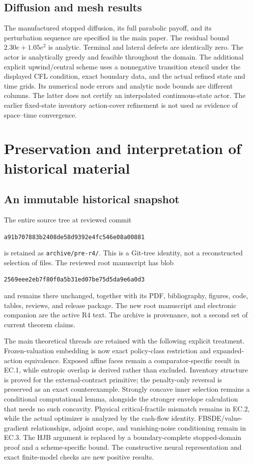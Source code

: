 \subsection{Diffusion and mesh results}
The manufactured stopped diffusion, its full parabolic payoff, and its perturbation sequence are specified in the main paper. The residual bound $2.30e+1.05e^2$ is analytic. Terminal and lateral defects are identically zero. The actor is analytically greedy and feasible throughout the domain. The additional explicit upwind/central scheme uses a nonnegative transition stencil under the displayed CFL condition, exact boundary data, and the actual refined state and time grids. Its numerical node errors and analytic node bounds are different columns. The latter does not certify an interpolated continuous-state actor. The earlier fixed-state inventory action-cover refinement is not used as evidence of space--time convergence.

\section{Preservation and interpretation of historical material}
\subsection{An immutable historical snapshot}
The entire source tree at reviewed commit
\begin{center}\texttt{a91b707883b2408de58d9392e4fc546e08a00881}\end{center}
is retained as \texttt{archive/pre-r4/}. This is a Git-tree identity, not a reconstructed selection of files. The reviewed root manuscript has blob
\begin{center}\texttt{2569eee2eb7f80f0a5b31ed07be75d5da9e6a0d3}\end{center}
and remains there unchanged, together with its PDF, bibliography, figures, code, tables, reviews, and release package. The new root manuscript and electronic companion are the active R4 text. The archive is provenance, not a second set of current theorem claims.

The main theoretical threads are retained with the following explicit treatment. Frozen-valuation embedding is now exact policy-class restriction and expanded-action equivalence. Exposed affine faces remain a comparator-specific result in EC.1, while entropic overlap is derived rather than excluded. Inventory structure is proved for the external-contract primitive; the penalty-only reversal is preserved as an exact counterexample. Strongly concave inner selection remains a conditional computational lemma, alongside the stronger envelope calculation that needs no such concavity. Physical critical-fractile mismatch remains in EC.2, while the actual optimizer is analyzed by the cash-flow identity. FBSDE/value-gradient relationships, adjoint scope, and vanishing-noise conditioning remain in EC.3. The HJB argument is replaced by a boundary-complete stopped-domain proof and a scheme-specific bound. The constructive neural representation and exact finite-model checks are new positive results.

